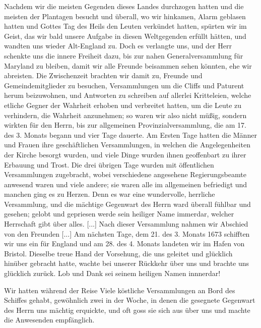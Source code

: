 Nachdem wir die meisten Gegenden dieses Landes durchzogen
hatten und die meisten der Plantagen besucht und überall, wo wir
hinkamen, Alarm geblasen hatten und Gottes Tag des Heils
den Leuten verkündet hatten, spürten wir im Geist, das wir
bald unsere Aufgabe in diesen Weltgegenden erfüllt hätten, und
wandten uns wieder Alt-England zu. Doch es verlangte uns,
und der Herr schenkte uns die innere Freiheit dazu, bis zur
nahen Generalversammlung 
für Maryland zu bleiben, damit wir
alle Freunde beisammen sehen könnten, ehe wir abreisten. Die
Zwischenzeit brachten wir damit zu, Freunde und Gemeindemitglieder
zu besuchen, Versammlungen um die Cliffs und Paturent herum
beizuwohnen, und Antworten zu schreiben auf allerlei Kritteleien,
welche etliche Gegner der Wahrheit erhoben und verbreitet hatten,
um die Leute zu verhindern, die Wahrheit anzunehmen; so waren
wir also nicht müßig, sondern wirkten für den Herrn, bis zur
allgemeinen Provinzialversammlung, die am 17. des 3. Monats
begann und vier Tage dauerte. Am Ersten Tage hatten die
Männer und Frauen ihre geschäftlichen Versammlungen, in welchen
die Angelegenheiten der Kirche besorgt wurden, und viele Dinge
wurden ihnen geoffenbart zu ihrer Erbauung und Trost. Die
drei übrigen Tage wurden mit öffentlichen 
Versammlungen zugebracht, 
wobei verschiedene angesehene Regierungsbeamte anwesend
waren und viele andere; sie waren alle im allgemeinen befriedigt
und manchen ging es zu Herzen. Denn es war eine wundervolle,
herrliche Versammlung, und die mächtige Gegenwart des Herrn
ward überall fühlbar und gesehen; gelobt und gepriesen werde
sein heiliger Name immerdar, welcher Herrschaft gibt über alles.
[...] Nach dieser Versammlung nahmen wir Abschied von den
Freunden [...] Am nächsten Tage, dem 21. des 3. Monats
1673 schifften wir uns ein für England und am 28. des 4. Monats
landeten wir im Hafen von Bristol. Dieselbe treue Hand der
Vorsehung, die uns geleitet und glücklich hinüber gebracht hatte,
wachte bei unserer Rückkehr über uns und brachte uns glücklich
zurück. Lob und Dank sei seinem heiligen Namen innnerdar!

Wir hatten während der Reise Viele köstliche Versammlungen
an Bord des Schiffes gehabt, gewöhnlich zwei in der Woche, in
denen die gesegnete Gegenwart des Herrn uns mächtig erquickte,
und oft goss sie sich aus über uns und machte die Anwesenden
empfänglich.
